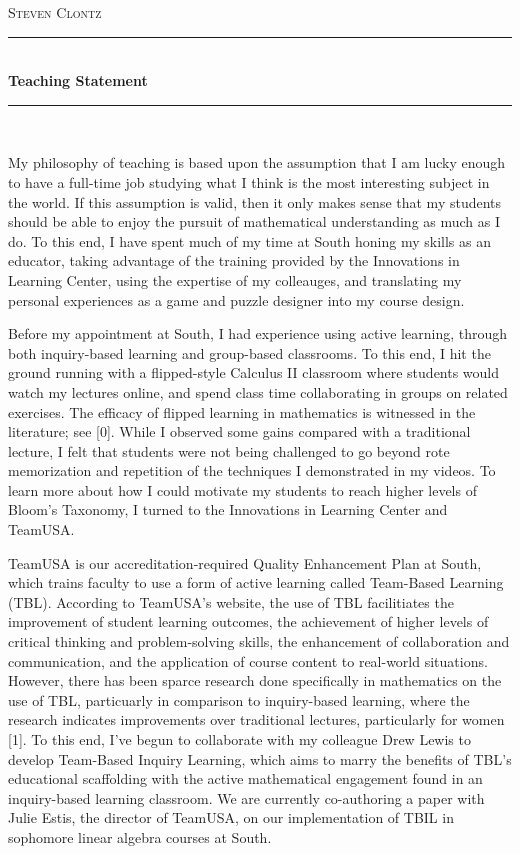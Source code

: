\documentclass[11pt]{amsart}
\theoremstyle{plain}
\newcommand{\HRule}{\rule{\linewidth}{0.5mm}}
\newcommand{\<}{\langle}
\renewcommand{\>}{\rangle}
\begin{document}
\begin{center}

\textsc{\huge Steven Clontz}

\HRule \\[0.1cm]
{ \huge \bfseries Teaching Statement \\[0.4cm] }

\HRule \\[1.5cm]

\end{center}

My philosophy of teaching is based upon the assumption that  I am lucky enough to have a full-time job studying what I think is the  most interesting subject in the world. If this assumption is valid, then it only makes sense that my students should be able to enjoy the pursuit of mathematical understanding as much as I do. To this end, I have spent much of my time at South honing my skills as an educator, taking advantage of the training provided by the Innovations in Learning Center, using the expertise of my colleauges, and translating  my personal experiences as a game and puzzle designer into my course design. 

Before my appointment at South, I had experience using active learning, through both inquiry-based learning and group-based classrooms. To this end, I hit the ground running with a flipped-style Calculus II classroom where students would watch my lectures online, and spend class time collaborating in groups on related exercises. The efficacy of flipped learning in mathematics is witnessed in the literature; see [0]. While I observed some gains compared with a traditional lecture, I felt that students were not being challenged to go beyond rote memorization and repetition of the techniques I demonstrated in my videos. To learn more about how I could motivate my students to reach higher levels of Bloom's Taxonomy, I turned to the Innovations in Learning Center and TeamUSA. 

TeamUSA is our accreditation-required Quality Enhancement Plan at South, which trains faculty to use a form of active learning called Team-Based Learning (TBL). According to TeamUSA's website, the use of TBL facilitiates the improvement of student learning outcomes, the achievement of higher levels of critical thinking  and problem-solving skills, the enhancement of collaboration and communication, and the application of course content to real-world situations. However, there has been sparce research done specifically in mathematics on the use of TBL, particuarly in comparison to inquiry-based learning, where the research indicates improvements over traditional lectures, particularly for women [1].  To this end, I've begun to collaborate with my colleague Drew Lewis to develop Team-Based Inquiry Learning, which aims to marry the benefits of TBL's educational scaffolding with the active mathematical engagement found in an inquiry-based learning classroom. We are currently co-authoring a paper with Julie Estis, the director of TeamUSA, on our implementation of TBIL in sophomore linear algebra courses at South. 
\end{document}
